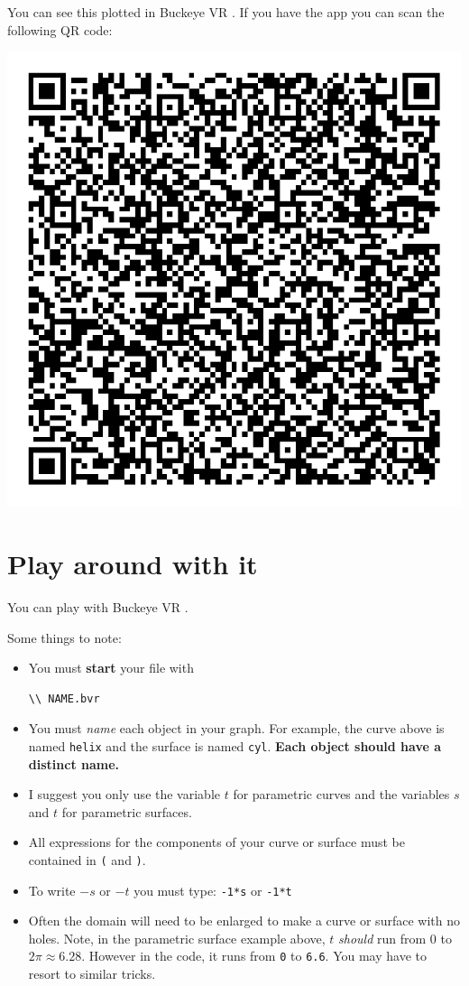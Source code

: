 \documentclass{ximera}
\begin{document}
You can see this plotted in Buckeye VR
.
If you have the app you can scan the following QR code:
\begin{image}
\includegraphics{bvrQR3.png}  
\end{image}

\section{Play around with it}
You can play with Buckeye VR 
.

Some things to note: 
\begin{itemize}
\item You must \textbf{start} your file with
\begin{verbatim}
\\ NAME.bvr
\end{verbatim}
  \item You must \textit{name} each object in your graph. For example,
    the curve above is named \verb|helix| and the surface is named
    \verb|cyl|. \textbf{Each object should have a distinct name.}
  \item I suggest you only use the variable $t$ for parametric curves
    and the variables $s$ and $t$ for parametric surfaces.
  \item All expressions for the components of your curve or surface
    must be contained in \verb|(| and \verb|)|.
  \item To write $-s$ or $-t$ you must type: \verb|-1*s| or \verb|-1*t|
  \item Often the domain will need to be enlarged to make a curve or
    surface with no holes. Note, in the parametric surface example
    above, $t$ \textit{should} run from $0$ to $2\pi\approx
    6.28$. However in the code, it runs from \verb|0| to
    \verb|6.6|. You may have to resort to similar tricks.
\end{itemize}
\end{document}
